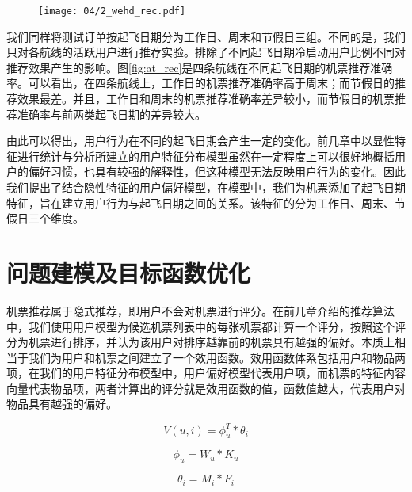 \begin{figure}[!h]
 \centering
 \texttt{[image: 04/2\_wehd\_rec.pdf]}
\end{figure}

我们同样将测试订单按起飞日期分为工作日、周末和节假日三组。不同的是，我们只对各航线的活跃用户进行推荐实验。排除了不同起飞日期冷启动用户比例不同对推荐效果产生的影响。图\ref{fig:at_rec}是四条航线在不同起飞日期的机票推荐准确率。可以看出，在四条航线上，工作日的机票推荐准确率高于周末；而节假日的推荐效果最差。并且，工作日和周末的机票推荐准确率差异较小，而节假日的机票推荐准确率与前两类起飞日期的差异较大。

由此可以得出，用户行为在不同的起飞日期会产生一定的变化。前几章中以显性特征进行统计与分析所建立的用户特征分布模型虽然在一定程度上可以很好地概括用户的偏好习惯，也具有较强的解释性，但这种模型无法反映用户行为的变化。因此我们提出了结合隐性特征的用户偏好模型，在模型中，我们为机票添加了起飞日期特征，旨在建立用户行为与起飞日期之间的关系。该特征的分为工作日、周末、节假日三个维度。

\section{问题建模及目标函数优化}

机票推荐属于隐式推荐，即用户不会对机票进行评分。在前几章介绍的推荐算法中，我们使用用户模型为候选机票列表中的每张机票都计算一个评分，按照这个评分为机票进行排序，并认为该用户对排序越靠前的机票具有越强的偏好。本质上相当于我们为用户和机票之间建立了一个效用函数。效用函数体系包括用户和物品两项，在我们的用户特征分布模型中，用户偏好模型代表用户项，而机票的特征内容向量代表物品项，两者计算出的评分就是效用函数的值，函数值越大，代表用户对物品具有越强的偏好。

\begin{equation}
\label{eq:utility}
	V(u,i) = \phi_u^T * \theta_i
\end{equation}

\begin{equation}
\label{eq:phi_u}
	\phi_u = W_u * K_u
\end{equation}

\begin{equation}
\label{eq:theta_i}
	\theta_i = M_i * F_i
\end{equation}

